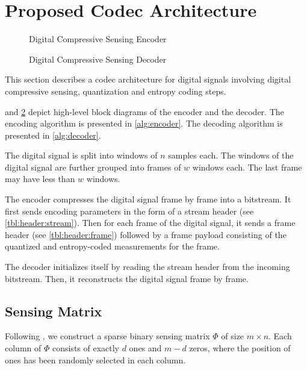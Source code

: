 \section{Proposed Codec Architecture}
\label{sec:arch}
\begin{figure}[!ht]
\centering 

\caption{Digital Compressive Sensing Encoder}
\label{fig-cs-encoder}
\end{figure}

\begin{figure}[!ht]
\centering 

\caption{Digital Compressive Sensing Decoder}
\label{fig-cs-decoder}
\end{figure}
This section describes a codec architecture
for digital signals involving digital
compressive sensing, quantization and entropy
coding steps.

and \cref{fig-cs-decoder}
depict high-level block diagrams of the encoder
and the decoder.
The encoding algorithm is presented in
\cref{alg:encoder}.
The decoding algorithm is presented in
\cref{alg:decoder}.

\begin{figure}[!t]
 \removelatexerror
 \centering

\end{figure}

\begin{figure}[!t]
 \removelatexerror
 \centering

\end{figure}

The digital signal is split into windows
of $n$ samples each. The windows of
the digital signal are further grouped into
frames of $w$ windows each. The
last frame may have less than $w$
windows.

The encoder compresses the digital signal
frame by frame into a bitstream.
It first sends
encoding parameters in the form
of a stream header (see \cref{tbl:header:stream}).
Then for each frame of the digital signal,
it sends a frame header (see \cref{tbl:header:frame})
followed by a frame payload consisting of the
quantized and entropy-coded measurements for the frame.

The decoder initializes itself by reading
the stream header from the incoming bitstream. 
Then, it reconstructs the digital signal
frame by frame.






\subsection{Sensing Matrix}
Following \cite{mamaghanian2011compressed},
we construct a sparse binary sensing matrix $\Phi$ of size
$m \times n$.
Each column of $\Phi$ consists of exactly $d$ ones and
$m-d$ zeros, where the position of ones has been randomly
selected in each column.

